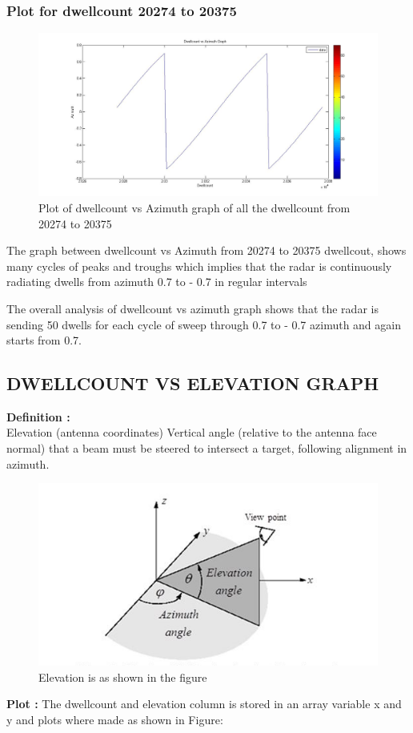\documentclass[14pt]{article} %
\begin{document}
   \subsubsection{Plot for dwellcount 20274 to 20375}
   \begin{figure}[H]
  \centerline{\includegraphics[width=\linewidth]{azimuth(20000,20100).jpg}}
  \caption{Plot of dwellcount vs Azimuth graph of all the dwellcount from 20274 to 20375}
  \label{fig:figure 23(c)}
  \end{figure}
  \begin{tcolorbox}[title =\textbf{Analysis}]
  The graph  between dwellcount vs Azimuth from 20274 to 20375 dwellcout, shows many cycles of peaks and troughs which implies that the radar is continuously radiating dwells from azimuth 0.7 to - 0.7 in regular intervals
  \end{tcolorbox}
  \begin{tcolorbox}[colframe=red]
  The overall analysis of dwellcount vs azimuth graph shows that the radar is sending 50 dwells for each cycle of sweep through 0.7 to - 0.7 azimuth and again starts from 0.7. 
  \end{tcolorbox}
  \subsection{DWELLCOUNT VS ELEVATION GRAPH}
  \noindent \textbf{Definition : }\\
   \indent Elevation (antenna coordinates) Vertical angle (relative to the antenna face normal) that a beam must be steered to intersect a target, following alignment in azimuth. 
   \begin{figure}[H]
  \centerline{\includegraphics[width=0.7\linewidth]{elevation.jpg}}
  \caption{Elevation is as shown in the figure}
  \label{fig:figure 23}
  \end{figure}
  \textbf{Plot : }The dwellcount and elevation column is stored in an array variable x and y and plots where made as shown in Figure:
  
\end{document}
